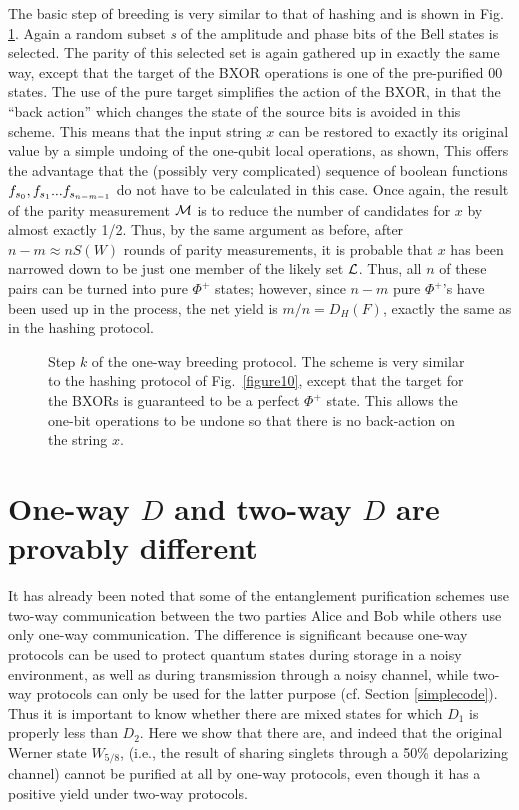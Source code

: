 The basic step of breeding is very similar to that of hashing and is
shown in Fig. \ref{breedfig}.  Again a random subset {\sl s} of the
amplitude and phase bits of the Bell states is selected.  The parity
of this selected set is again gathered up in exactly the same way,
except that the target of the BXOR operations is one of the
pre-purified 00 states.  The use of the pure target simplifies the
action of the BXOR, in that the ``back action'' which changes the
state of the source bits is avoided in this scheme.  This means that
the input string $x$ can be restored to exactly its original value by
a simple undoing of the one-qubit local operations, as shown, This
offers the advantage that the (possibly very complicated) sequence of
boolean functions $f_{{\sl s}_0}, f_{{\sl s}_1}...f_{{\sl s}_{n-m-1}}$
do not have to be calculated in this case.  Once again, the result of
the parity measurement $\cal M$ is to reduce the number of
candidates for $x$ by almost exactly 1/2.  Thus, by the same argument
as before, after $n\!-\!m\approx nS(W)$ rounds of parity
measurements, it is probable that $x$ has been narrowed down to be
just one member of the likely set $\cal L$.  Thus, all $n$ of these
pairs can be turned into pure $\Phi^+$ states; however, since $n\!-\!m$
pure $\Phi^+$'s have been used up in the process, the net yield is
$m/n=D_H(F)$, exactly the same as in the hashing protocol.
\begin{figure}[htbp]
\centerline{}
\caption[EPP11.eps: Breeding]{Step $k$ of the one-way breeding protocol.
The scheme is
very similar to the hashing protocol of Fig.~\protect\ref{figure10},
except that the target for the BXORs is guaranteed to be a perfect
$\Phi^+$ state.  This allows the one-bit operations to be undone so
that there is no back-action on the string $x$.}
\label{breedfig}
\end{figure}
 
\section{One-way $D$ and two-way $D$ are provably different}
\label{sec:D1D2}
 
It has already been noted that some of the entanglement purification
schemes use two-way communication between the two parties Alice and
Bob while others use only one-way communication.  The difference is
significant because one-way protocols can be used to protect quantum
states during storage in a noisy environment, as well as during
transmission through a noisy channel, while two-way protocols can only
be used for the latter purpose (cf. Section \ref{simplecode}).
Thus it is important to know whether there are mixed states for which
$D_1$ is properly less than $D_2$.  Here we show that there are, and
indeed that the original Werner state $W_{5/8}$, (i.e., the result of
sharing singlets through a 50\% depolarizing channel) cannot be
purified at all by one-way protocols, even though it has a positive
yield under two-way protocols.
 
